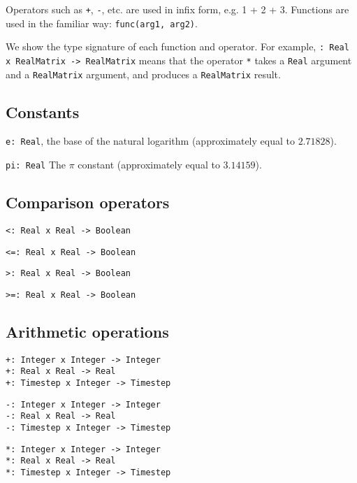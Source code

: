 Operators such as \verb|+|, \verb|-|, etc. are used in infix form, e.g. 1 + 2 +
3. Functions are used in the familiar way: \verb|func(arg1, arg2)|.

We show the type signature of each function and operator. For example, {\tt *:
Real x RealMatrix -> RealMatrix} means that the operator \verb|*| takes a
\verb|Real| argument and a \verb|RealMatrix| argument, and produces a
\verb|RealMatrix| result.


\subsection{Constants}
\label{sec:builtin-constants}

\verb|e: Real|,  the base of the natural logarithm (approximately equal to $2.71828$).

\verb|pi: Real| The $\pi$ constant (approximately equal to $3.14159$).


\subsection{Comparison operators}
\label{sec:builtin-comparison}

\verb|<: Real x Real -> Boolean|

\verb|<=: Real x Real -> Boolean|

\verb|>: Real x Real -> Boolean|

\verb|>=: Real x Real -> Boolean|



\subsection{Arithmetic operations}
\label{sec:builtin-arithmetic}

\verb|+: Integer x Integer -> Integer| \\
\verb|+: Real x Real -> Real| \\
\verb|+: Timestep x Integer -> Timestep|

\verb|-: Integer x Integer -> Integer| \\
\verb|-: Real x Real -> Real| \\
\verb|-: Timestep x Integer -> Timestep|

\verb|*: Integer x Integer -> Integer| \\
\verb|*: Real x Real -> Real| \\
\verb|*: Timestep x Integer -> Timestep|

